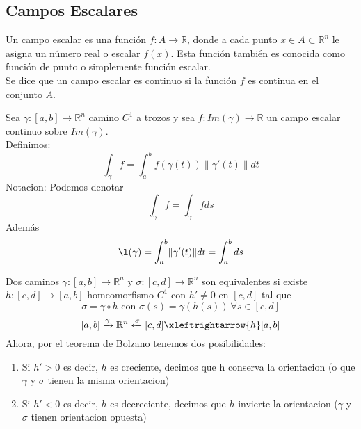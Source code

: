 \subsection{Campos Escalares}

\begin{definición} 
Un campo escalar es una función $f: A \to \mathbb{R}$, donde a cada punto $x \in A \subset \mathbb{R}^n$ le asigna un número real o escalar $f(x)$. Esta función también es conocida como función de punto o simplemente función escalar.\\
Se dice que un campo escalar es continuo si la función $f$ es continua en el conjunto $A$.
\end{definición}

\begin{definición} 
Sea $\gamma : [a,b] \to \mathbb{R}^n$ camino $C^1$ a trozos y sea $f:Im(\gamma) \to \mathbb{R}$ un campo escalar continuo sobre $Im(\gamma)$.\\
Definimos:
$$ \int_{\gamma} f = \int_{a}^{b} f(\gamma(t)) \lVert \gamma'(t) \rVert dt$$
Notacion: Podemos denotar $$\int_{\gamma} f = \int_{\gamma} f ds$$
Además
$$\l(\gamma) = \int_{a}^{b} \lVert \gamma'(t) \rVert dt = \int_{a}^{b} ds$$
\end{definición}

\begin{definición} 
Dos caminos $\gamma: [a,b] \to \mathbb{R}^n$ y $\sigma:[c,d] \to \mathbb{R}^n$ son equivalentes si existe $h:[c,d] \to [a,b]$ homeomorfismo $C^1$ con $h' \neq 0$ en $[c,d]$ tal que
$$\sigma = \gamma \circ h \text{ con } \sigma(s) = \gamma(h(s)) \ \forall s \in [c,d]$$
$$[a,b] \xrightarrow{\gamma} \mathbb{R}^n \xleftarrow{\sigma}[c,d] \xleftrightarrow{h} [a,b]$$
Ahora, por el teorema de Bolzano tenemos dos posibilidades:
\begin{enumerate}
    \item Si $h'>0$ es decir, $h$ es creciente, decimos que h conserva la orientacion (o
          que $\gamma$ y $\sigma$ tienen la misma orientacion)
    \item Si $h'<0$ es decir, $h$ es decreciente, decimos que $h$ invierte la orientacion
          ($\gamma$ y $\sigma$ tienen orientacion opuesta)
\end{enumerate}
\end{definición}

